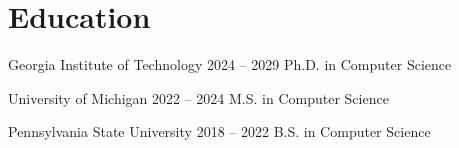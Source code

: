\section{Education}
\CVEntry
  {Georgia Institute of Technology}
  {2024 -- 2029}
  {Ph.D. in Computer Science}
\CVGap

\CVEntry
  {University of Michigan}
  {2022 -- 2024}
  {M.S. in Computer Science}
\CVGap

\CVEntry
  {Pennsylvania State University}
  {2018 -- 2022}
  {B.S. in Computer Science}
\CVGap
